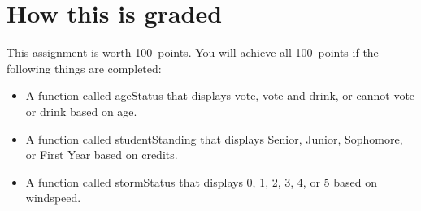 \documentclass{article}
\newcommand{\AValue}{100}
\begin{document}
\section*{How this is graded}
This assignment is worth \AValue \ points. You will achieve all \AValue \   points if the following things are completed:
\begin{itemize}
    \item A function called ageStatus that displays vote, vote and drink, or cannot vote or drink based on age.
    \item A function called studentStanding that displays Senior, Junior, Sophomore, or First Year based on credits.
    \item A function called stormStatus that displays 0, 1, 2, 3, 4, or 5 based on windspeed.
\end{itemize}
\end{document}
